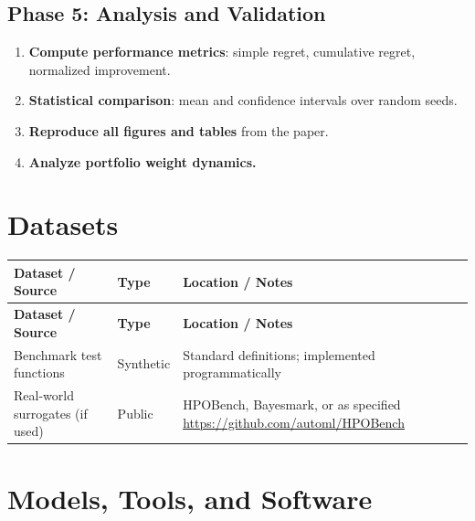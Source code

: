 \documentclass[11pt,a4paper]{article}
\begin{document}
\subsection{Phase 5: Analysis and Validation}
\begin{enumerate}[label=\textbf{5.\arabic*}]
  \item \textbf{Compute performance metrics}: simple regret, cumulative regret, normalized improvement.
  \item \textbf{Statistical comparison}: mean and confidence intervals over random seeds.
  \item \textbf{Reproduce all figures and tables} from the paper.
  \item \textbf{Analyze portfolio weight dynamics.}
\end{enumerate}

\section{Datasets}

\begin{longtable}{p{4.5cm} p{3.5cm} p{6cm}}
\toprule
\textbf{Dataset / Source} & \textbf{Type} & \textbf{Location / Notes} \\
\midrule
\endfirsthead
\toprule
\textbf{Dataset / Source} & \textbf{Type} & \textbf{Location / Notes} \\
\midrule
\endhead
Benchmark test functions & Synthetic & Standard definitions; implemented programmatically \\
\midrule
Real-world surrogates (if used) & Public & HPOBench, Bayesmark, or as specified \newline \url{https://github.com/automl/HPOBench} \\
\bottomrule
\end{longtable}

\section{Models, Tools, and Software}
\end{document}
